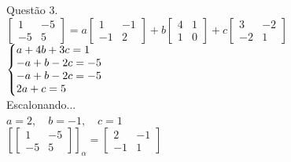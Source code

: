 \documentclass[12pt]{article}
\begin{document}
Questão 3.\\
$\begin{bmatrix}1&-5\\-5&5\end{bmatrix}=
a\begin{bmatrix}1&-1\\-1&2\end{bmatrix}+
b\begin{bmatrix}4&1\\1&0\end{bmatrix}+
c\begin{bmatrix}3&-2\\-2&1\end{bmatrix}$\\
$\left\{\begin{array}{@{}l@{}}
	a+4b+3c=1\\
	-a+b-2c=-5\\
	-a+b-2c=-5\\
	2a+c=5
\end{array}\right. $\\
Escalonando...\\
$a=2,\quad b=-1,\quad c=1$\\
$[\begin{bmatrix}1&-5\\-5&5\end{bmatrix}]_{\alpha} = \begin{bmatrix}2&-1\\-1&1\end{bmatrix}$\\\\
\end{document}
